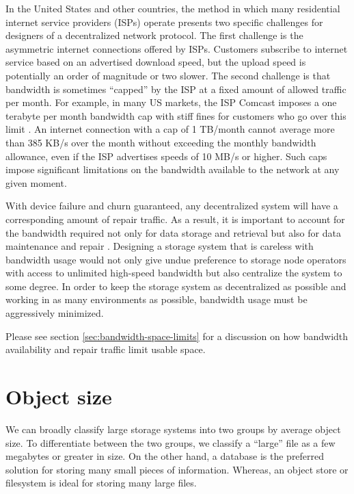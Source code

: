 \documentclass[8pt,fleqn,openany]{book}
\begin{document}
In the United States and other countries,
the method in which many residential internet service providers (ISPs)
operate presents two specific challenges for designers of a
decentralized network protocol. The first challenge is
the asymmetric internet connections offered by ISPs.
Customers subscribe to internet service
based on an advertised download speed, but the upload speed is potentially an
order of magnitude or two slower. The second challenge is that bandwidth is
sometimes ``capped'' by the ISP at a fixed amount of allowed traffic per month.
For example, in many
US markets, the ISP Comcast imposes a one terabyte per month bandwidth cap
with stiff fines for customers who go over this limit \cite{comcast-cap}.
An internet connection with a cap of 1 TB/month cannot average more than
385 KB/s over the month without exceeding the monthly bandwidth allowance,
even if the ISP advertises speeds of 10 MB/s or higher.
Such caps impose
significant limitations on the bandwidth available to the network
at any given moment.

With device failure and churn guaranteed, any decentralized system will have a
corresponding amount of repair traffic. As a result, it is important to account
for the bandwidth required not only for data storage and retrieval but also
for data maintenance and repair \cite{pick2-churn}. Designing a
storage system that is careless with bandwidth usage would not only give undue
preference to storage node operators with access to unlimited high-speed
bandwidth but also centralize the system to some degree. In order to keep the storage
system as decentralized as possible and working in as many environments
as possible, bandwidth usage must be aggressively minimized.

Please see section \ref{sec:bandwidth-space-limits} for a discussion on how
bandwidth availability and repair traffic limit usable space.

\section{Object size}

We can broadly classify large storage systems into two groups by average
object size. To differentiate between the two groups, we classify a ``large'' file as a
few megabytes or greater in size. On the other hand, a database is the
preferred solution for storing many small pieces of information.
Whereas, an object store or filesystem is ideal for storing many large files.
\end{document}
